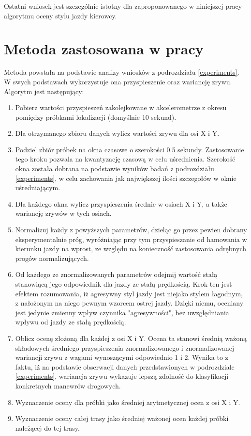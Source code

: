 Ostatni wniosek jest szczególnie istotny dla zaproponowanego w niniejszej pracy algorytmu oceny stylu jazdy kierowcy. 

\section{Metoda zastosowana w pracy}

Metoda powstała na podstawie analizy wniosków z podrozdziału \ref{experiments}. W swych podstawach wykorzystuje ona przyspieszenie oraz wariancję zrywu. Algorytm jest następujący:

\begin{enumerate}
\item Pobierz wartości przyspieszeń zakolejkowane w akcelerometrze z okresu pomiędzy próbkami lokalizacji (domyślnie 10 sekund).
\item Dla otrzymanego zbioru danych wylicz wartości zrywu dla osi X i Y.
\item Podziel zbiór próbek na okna czasowe o szerokości 0.5 sekundy. Zastosowanie tego kroku pozwala na kwantyzację czasową w celu uśrednienia. Szerokość okna została dobrana na podstawie wyników badań z podrozdziału \ref{experiments}, w celu zachowania jak największej ilości szczegołów w oknie uśredniającym.
\item Dla każdego okna wylicz przyspieszenia średnie w osiach X i Y, a także wariancję zrywów w tych osiach.
\item Normalizuj każdy z powyższych parametrów, dzieląc go przez pewien dobrany eksperymentalnie próg, wyróżniając przy tym przyspieszanie od hamowania w kierunku jazdy na wprost, ze względu na konieczność zastosowania odrębnych progów normalizujących.
\item Od każdego ze znormalizowanych parametrów odejmij wartość stałą stanowiącą jego odpowiednik dla jazdy ze stałą prędkością. Krok ten jest efektem rozumowania, iż agresywny styl jazdy jest niejako stylem łagodnym, z nałożonym na niego pewnym wzorcem ostrej jazdy. Dzięki niemu, oceniany jest jedynie zmienny wpływ czynnika "agresywności", bez uwzględniania wpływu od jazdy ze stałą prędkością.
\item Oblicz ocenę złożoną dla każdej z osi X i Y. Ocena ta stanowi średnią ważoną składowych średniego przyspieszenia znormalizowanego i znormalizowanej wariancji zrywu z wagami wynoszącymi odpowiednio 1 i 2. Wynika to z faktu, iż na podstawie obserwacji danych przedstawionych w podrozdziale \ref{experiments}, wariancja zrywu wykazuje lepszą zdolność do klasyfikacji konkretnych manewrów drogowych.
\item Wyznaczenie oceny dla próbki jako średniej arytmetycznej ocen z osi X i Y.
\item Wyznaczenie oceny całej trasy jako średniej ważonej ocen każdej próbki należącej do tej trasy.
\end{enumerate}

